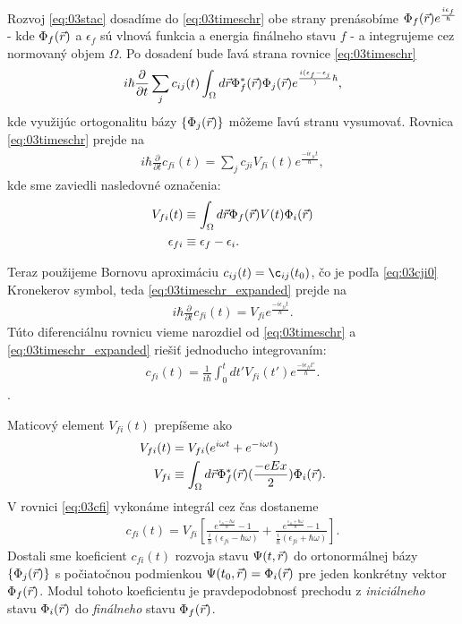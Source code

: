 Rozvoj \eqref{eq:03stac} dosadíme do \eqref{eq:03timeschr} obe strany prenásobíme $\Phi_f(\vec{r})e^{\frac{i\epsilon_f}{\hbar}}$ - kde $\Phi_f(\vec{r})$ a $\epsilon_f$ sú vlnová funkcia a energia finálneho stavu $f$ - a integrujeme cez normovaný objem $\Omega$. Po dosadení bude ľavá strana rovnice \eqref{eq:03timeschr} 
\begin{align}
i\hbar\frac{\partial}{\partial t} \sum_j c_{ij}(t)\int_{\Omega} d\vec{r} \Phi_f^{*}(\vec{r})\Phi_j(\vec{r})e^{\frac{i(\epsilon_f-\epsilon_j}){\hbar}} \text{,}
\end{align}
kde využijúc ortogonalitu bázy $\{\Phi_j(\vec{r})\}$ môžeme ľavú stranu vysumovať. Rovnica \eqref{eq:03timeschr} prejde na 
\begin{align}
\label{eq:03timeschr_expanded}
i\hbar\frac{\partial}{\partial t}c_{fi}(t)=\sum_j c_{ji} V_{fi}(t)e^{\frac{-i \epsilon_{fi} t}{\hbar}} \mathrm{,}
\end{align}
kde sme zaviedli nasledovné označenia:
\begin{align}
V_{fi}(t) &\equiv \int_{\Omega}d\vec{r} \Phi_f(\vec{r})V(t)\Phi_i(\vec{r}) \\
\epsilon_{fi} &\equiv \epsilon_f - \epsilon_i \text{.}
\end{align}

Teraz použijeme Bornovu aproximáciu $c_{ij}(t)=\c_{ij}(t_0)$, čo je podľa \eqref{eq:03cji0} Kronekerov symbol, teda \eqref{eq:03timeschr_expanded} prejde na
\begin{align}
\label{eq:03born_appr}
i\hbar\frac{\partial}{\partial t}c_{fi}(t)=V_{fi}e^{\frac{-i\epsilon_{fi} t}{\hbar}}\mathrm{.}
\end{align}
Túto diferenciálnu rovnicu vieme narozdiel od \eqref{eq:03timeschr} a \eqref{eq:03timeschr_expanded} riešiť jednoducho integrovaním:
\begin{align}
\label{eq:03cfi}
c_{fi}(t) = \frac{1}{i\hbar} \int_0^t dt' V_{fi}(t')e^{\frac{-i\epsilon_{fi} t'}{\hbar}} \text{.}
\end{align}.

Maticový element $V_{fi}(t)$ prepíšeme ako
\begin{align}
V_{fi}(t)&=V_{fi}(e^{i\omega t}+e^{-i\omega t})\\
\label{eq:03Vfi}
V_{fi}&\equiv \int_{\Omega} d\vec{r} \Phi_f^{*}(\vec{r})(\frac{-eEx}{2})\Phi_i(\vec{r}) \text{.}
\end{align}
V rovnici \eqref{eq:03cfi} vykonáme integrál cez čas dostaneme
\begin{align}
\label{eq:03cfi_final}
c_{fi}(t)=V_{fi}[\frac{e^{\frac{\epsilon_{fi} - \hbar\omega}{\hbar}}-1}{\frac{i}{\hbar}(\epsilon_{fi}-\hbar\omega)}+\frac{e^{\frac{\epsilon_{fi} + \hbar\omega}{\hbar}}-1}{\frac{i}{\hbar}(\epsilon_{fi}+\hbar\omega)}] \text{.}
\end{align}
Dostali sme koeficient $c_{fi}(t)$ rozvoja  stavu $\Psi(t,\vec{r})$ do ortonormálnej bázy $\{\Phi_j(\vec{r})\}$ s počiatočnou podmienkou $\Psi(t_0,\vec{r})=\Phi_i(\vec{r})$ pre jeden konkrétny vektor $\Phi_f(\vec{r})$. Modul tohoto koeficientu je pravdepodobnosť prechodu z {\it iniciálneho} stavu $\Phi_i(\vec{r})$ do {\it finálneho} stavu $\Phi_f(\vec{r})$.

